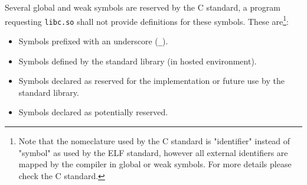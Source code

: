 Several global and weak symbols
are reserved by the C standard,
a program requesting \texttt{libc.so}
shall not provide definitions for these symbols.
These are\footnote{%
   Note that the nomeclature used by the C standard is
   "identifier" instead of "symbol" as used by the ELF standard,
   however all external identifiers are mapped by the compiler in
   global or weak symbols.
   For more details please check the C standard\cite{ISO9899}.
}:

\begin{itemize}
   \item Symbols prefixed with an underscore (\texttt{\_}).
   \item Symbols defined by the standard library (in hosted environment).
   \item Symbols declared as reserved for the implementation
   or future use by the standard library.
   \item Symbols declared as potentially reserved.
\end{itemize}

